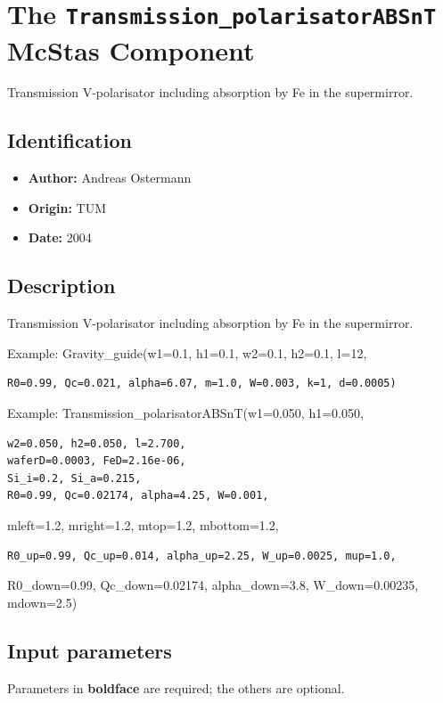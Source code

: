 \section{The \texttt{Transmission\_polarisatorABSnT} McStas Component}
Transmission V-polarisator including absorption by Fe in the supermirror.

\subsection*{Identification}
\begin{itemize}
  \item \textbf{Author:} Andreas Ostermann
  \item \textbf{Origin:} TUM
  \item \textbf{Date:} 2004
\end{itemize}

\subsection*{Description}
Transmission V-polarisator including absorption by Fe in the supermirror.

Example: Gravity\_guide(w1=0.1, h1=0.1, w2=0.1, h2=0.1, l=12,

\begin{verbatim}
R0=0.99, Qc=0.021, alpha=6.07, m=1.0, W=0.003, k=1, d=0.0005)
\end{verbatim}

Example: Transmission\_polarisatorABSnT(w1=0.050, h1=0.050,

\begin{verbatim}
w2=0.050, h2=0.050, l=2.700,
waferD=0.0003, FeD=2.16e-06,
Si_i=0.2, Si_a=0.215,
R0=0.99, Qc=0.02174, alpha=4.25, W=0.001,
\end{verbatim}

mleft=1.2, mright=1.2, mtop=1.2, mbottom=1.2,

\begin{verbatim}
R0_up=0.99, Qc_up=0.014, alpha_up=2.25, W_up=0.0025, mup=1.0,
\end{verbatim}

R0\_down=0.99, Qc\_down=0.02174, alpha\_down=3.8, W\_down=0.00235, mdown=2.5)

\subsection*{Input parameters}
Parameters in \textbf{boldface} are required; the others are optional.


